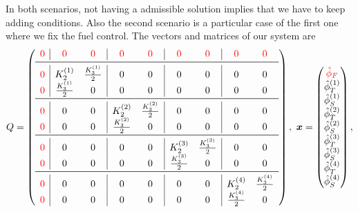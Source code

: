 \documentclass[12pt]{article}
\theoremstyle{definition}
\theoremstyle{remark}
\begin{document}
In both scenarios, not having a admissible solution implies that we have to keep adding conditions. Also the second scenario is a particular case of the first one where we fix the fuel control. The vectors and matrices of our system are
\begin{equation*}
Q=\left(\begin{array}{c|cc|cc|cc|cc}
\color{red}0 & \color{red}0 & \color{red}0 & \color{red}0 & \color{red}0 & \color{red}0 & \color{red}0 & \color{red}0 & \color{red}0 \\
\midrule
\color{red}0 & K_2^{(1)} & \frac{K_3^{(1)}}{2} & 0 & 0 & 0 & 0 & 0 & 0 \\
\color{red}0 & \frac{K_3^{(1)}}{2} & 0 & 0 & 0 & 0 & 0 & 0 & 0 \\
\midrule
\color{red}0 & 0 & 0 & K_2^{(2)} & \frac{K_3^{(2)}}{2} & 0 & 0 & 0 & 0 \\
\color{red}0 & 0 & 0 & \frac{K_3^{(2)}}{2} & 0 & 0 & 0 & 0 & 0 \\
\midrule
\color{red}0 & 0 & 0 & 0 & 0 & K_2^{(3)} & \frac{K_3^{(3)}}{2} & 0 & 0 \\
\color{red}0 & 0 & 0 & 0 & 0 & \frac{K_3^{(3)}}{2} & 0 & 0 & 0 \\
\midrule
\color{red}0 & 0 & 0 & 0 & 0 & 0 & 0 & K_2^{(4)} & \frac{K_3^{(4)}}{2} \\
\color{red}0 & 0 & 0 & 0 & 0 & 0 & 0 & \frac{K_3^{(4)}}{2} & 0 \\
\end{array}\right),\ \bm{x}=\begin{pmatrix}
\color{red}\hat{\phi}_F \\
\hat{\phi}_T^{(1)} \\
\hat{\phi}_S^{(1)} \\
\hat{\phi}_T^{(2)} \\
\hat{\phi}_S^{(2)} \\
\hat{\phi}_T^{(3)} \\
\hat{\phi}_S^{(3)} \\
\hat{\phi}_T^{(4)} \\
\hat{\phi}_S^{(4)}
\end{pmatrix},
\end{equation*}
\end{document}
